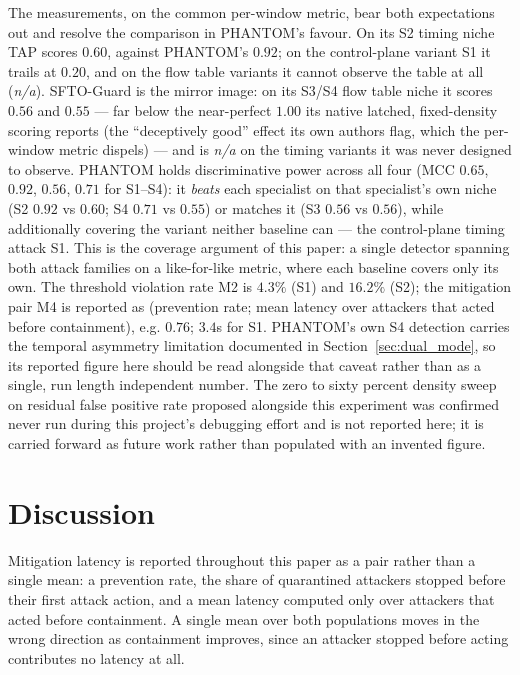 \documentclass[final,5p,twocolumn]{elsarticle}
\theoremstyle{remark}
\theoremstyle{plain}
\begin{document}
The measurements, on the common per-window metric, bear both expectations out
and resolve the comparison in PHANTOM's favour. On its S2 timing niche TAP
scores $0.60$, against PHANTOM's $0.92$; on the control-plane variant S1 it
trails at $0.20$, and on the flow table variants it cannot observe the table at
all (\emph{n/a}). SFTO-Guard is the mirror image: on its S3/S4 flow table niche
it scores $0.56$ and $0.55$ --- far below the near-perfect $1.00$ its native
latched, fixed-density scoring reports (the ``deceptively good'' effect its own
authors flag, which the per-window metric dispels) --- and is \emph{n/a} on the
timing variants it was never designed to observe. PHANTOM holds discriminative
power across all four (MCC $0.65$, $0.92$, $0.56$, $0.71$ for S1--S4): it
\emph{beats} each specialist on that specialist's own niche (S2 $0.92$ vs
$0.60$; S4 $0.71$ vs $0.55$) or matches it (S3 $0.56$ vs $0.56$), while
additionally covering the variant neither baseline can --- the control-plane
timing attack S1. This is the coverage argument of this paper: a single detector
spanning both attack families on a like-for-like metric, where each baseline
covers only its own.
The threshold violation rate M2 is $4.3\%$ (S1) and $16.2\%$ (S2); the
mitigation pair M4 is reported as (prevention rate; mean latency over
attackers that acted before containment), e.g. $0.76$; $3.4$s for S1.
PHANTOM's own S4 detection carries the temporal asymmetry limitation
documented in Section~\ref{sec:dual_mode}, so its reported figure here
should be read alongside that caveat rather than as a single, run length
independent number. The zero to sixty percent density sweep on residual
false positive rate proposed alongside this experiment was confirmed never
run during this project's debugging effort and is not reported here; it is
carried forward as future work rather than populated with an invented
figure.


\section{Discussion}
\label{sec:discussion}

Mitigation latency is reported throughout this paper as a pair rather than a
single mean: a prevention rate, the share of quarantined attackers stopped
before their first attack action, and a mean latency computed only over
attackers that acted before containment. A single mean over both
populations moves in the wrong direction as containment improves, since an
attacker stopped before acting contributes no latency at all.
\end{document}
